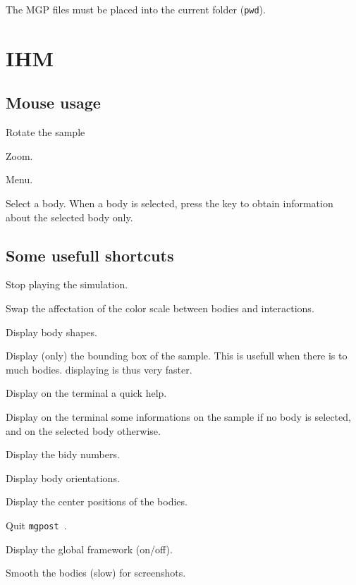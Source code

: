 \documentclass{simpledoc}
\newcommand{\mgpost}{\texttt{mgpost}\ }
\newcommand{\screen}[1]{\texttt{#1}}
\newcommand{\key}[1]{\fbox{#1}}
\begin{document}
\attention
The MGP files must be placed into the current folder (\screen{pwd}).

\section{IHM}

\subsection{Mouse usage}

 Rotate the sample

 Zoom. 

 Menu.

 Select a body. 
When a body is selected, press the key \key{i} to obtain
information about the selected body only.

\subsection{Some usefull shortcuts}

\marginlabel{\key{space}}
Stop playing the simulation.

\marginlabel{\key{c}}
Swap the affectation of the color scale between bodies and interactions.

\marginlabel{\key{d}}
Display body shapes.

\marginlabel{\key{e}}
Display (only) the bounding box of the sample.
This is usefull when there is to much bodies. displaying is thus very faster.

\marginlabel{\key{h}}
Display on the terminal a quick help.

\marginlabel{\key{i}}
Display on the terminal some informations on the sample if no body is selected, and on the selected body otherwise.

\marginlabel{\key{n}}
Display the bidy numbers.

\marginlabel{\key{o}}
Display body orientations.

\marginlabel{\key{p}}
Display the center positions of the bodies.

\marginlabel{\key{q}}
Quit \mgpost.

\marginlabel{\key{r}}
Display the global framework  (on/off).

\marginlabel{\key{s}}
Smooth the bodies (slow) for screenshots.
\end{document}
